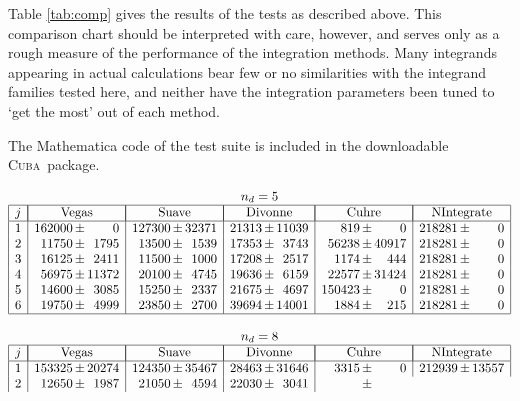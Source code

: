 \documentclass[12pt]{article}
\newcommand\cuba{\textsc{Cuba}}
\begin{document}
Table \ref{tab:comp} gives the results of the tests as described above. 
This comparison chart should be interpreted with care, however, and
serves only as a rough measure of the performance of the integration
methods.  Many integrands appearing in actual calculations bear few or
no similarities with the integrand families tested here, and neither
have the integration parameters been tuned to `get the most' out of each
method.

The Mathematica code of the test suite is included in the downloadable 
\cuba\ package.

\begin{table}
$$
\begin{array}{|c|r@{\,\pm\,}r|r@{\,\pm\,}r|r@{\,\pm\,}r
                |r@{\,\pm\,}r|r@{\,\pm\,}r|}
\multicolumn{11}{c}{n_d = 5} \\ \hline
j &
\multicolumn{2}{|c|}{\text{Vegas}} &
\multicolumn{2}{|c|}{\text{Suave}} &
\multicolumn{2}{|c|}{\text{Divonne}} &
\multicolumn{2}{|c|}{\text{Cuhre}} &
\multicolumn{2}{|c|}{\text{NIntegrate}} \\ \hline
1 & 162000 &     0 &
    127300 & 32371 &
     21313 & 11039 &
       819 &     0 &
    218281 &     0 \\
2 &  11750 &  1795 &
     13500 &  1539 &
     17353 &  3743 &
     56238 & 40917 &
    218281 &     0 \\
3 &  16125 &  2411 &
     11500 &  1000 &
     17208 &  2517 &
      1174 &   444 &
    218281 &     0 \\
4 &  56975 & 11372 &
     20100 &  4745 &
     19636 &  6159 &
     22577 & 31424 &
    218281 &     0 \\
5 &  14600 &  3085 &
     15250 &  2337 &
     21675 &  4697 &
    150423 &     0 &
    218281 &     0 \\
6 &  19750 &  4999 &
     23850 &  2700 &
     39694 & 14001 &
      1884 &   215 &
    218281 &     0 \\ \hline
\multicolumn{11}{c}{} \\
\multicolumn{11}{c}{n_d = 8} \\ \hline
j &
\multicolumn{2}{|c|}{\text{Vegas}} &
\multicolumn{2}{|c|}{\text{Suave}} &
\multicolumn{2}{|c|}{\text{Divonne}} &
\multicolumn{2}{|c|}{\text{Cuhre}} &
\multicolumn{2}{|c|}{\text{NIntegrate}} \\ \hline
1 & 153325 & 20274 &
    124350 & 35467 &
     28463 & 31646 &
      3315 &     0 &
    212939 & 13557 \\
2 &  12650 &  1987 &
     21050 &  4594 &
     22030 &  3041 &

\end{array}$$
\end{table}
\end{document}
